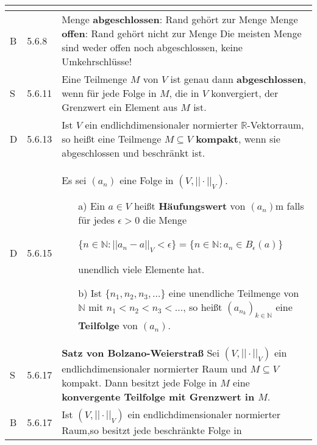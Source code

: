 \begin{longtable}{p{0.75cm} p{1cm} p{16cm}}
\begin{itemize}[topsep=-0.5cm]
                        \end{itemize} \vspace{-0cm} \\
        \midrule
        B   & 5.6.8 &   Menge \textbf{abgeschlossen}: Rand gehört zur Menge \hfill \break
                    Menge \textbf{offen}: Rand gehört nicht zur Menge \hfill \break
                    Die meisten Menge sind weder offen noch abgeschlossen, keine Umkehrschlüsse! \\
        \midrule
        S   & 5.6.11 &  Eine Teilmenge $M$ von $V$ ist genau dann \textbf{abgeschlossen}, wenn für jede Folge in $M$, die in $V$ konvergiert,
                    der Grenzwert ein Element aus $M$ ist. \\
        \midrule
        D   & 5.6.13&   Ist $V$ ein endlichdimensionaler normierter $\mathbb{R}$-Vektorraum, so hei\ss t eine Teilmenge $M \subseteq V$
                        \textbf{kompakt}, wenn sie abgeschlossen und beschränkt ist. \\
        \midrule
        D   & 5.6.15&   Es sei $(a_n)$ eine Folge in $(V, ||\cdot||_V)$.
                        \begin{itemize}[topsep=-0.5cm]
                            \item[a)] Ein $a \in V$ hei\ss t \textbf{Häufungswert} von $(a_n)$m falls für jedes $\epsilon > 0$ die Menge \hfill \break
                                        \centerline{\{$n \in \mathbb{N} : ||a_n - a||_V < \epsilon\} = \{n \in \mathbb{N}: a_n \in B_{\epsilon}(a)\}$}
                                        unendlich viele Elemente hat.
                            \item[b)] Ist $\{n_1,n_2,n_3,\dots\}$ eine unendliche Teilmenge von $\mathbb{N}$ mit $n_1 < n_2 < n_3 < \dots$, so
                                        hei\ss t $(a_{n_k})_{k \in \mathbb{N}}$ eine \textbf{Teilfolge} von $(a_n)$. 
                        \end{itemize} \vspace{-0cm} \\
        \midrule
        S   & 5.6.17&   \textbf{Satz von Bolzano-Weierstra\ss} \hfill \break
                    Sei $(V, ||\cdot||_V)$ ein endlichdimensionaler normierter Raum und $M \subseteq V$ kompakt. Dann besitzt jede Folge in $M$
                    eine \textbf{konvergente Teilfolge mit Grenzwert in $M$}. \\
        \midrule
        B   & 5.6.17&   Ist $(V,||\cdot||_V)$ ein endlichdimensionaler normierter Raum,so besitzt jede beschränkte Folge in 

\end{longtable}

